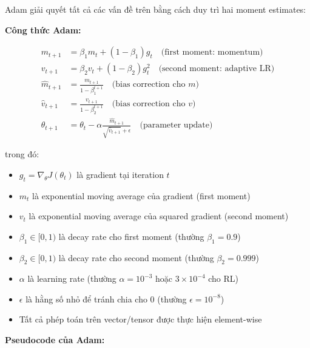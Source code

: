 Adam giải quyết tất cả các vấn đề trên bằng cách duy trì hai moment estimates:

\textbf{Công thức Adam:}

\begin{equation}
\begin{aligned}
m_{t+1} &= \beta_1 m_t + (1 - \beta_1) g_t \quad \text{(first moment: momentum)} \\
v_{t+1} &= \beta_2 v_t + (1 - \beta_2) g_t^2 \quad \text{(second moment: adaptive LR)} \\
\hat{m}_{t+1} &= \frac{m_{t+1}}{1 - \beta_1^{t+1}} \quad \text{(bias correction cho $m$)} \\
\hat{v}_{t+1} &= \frac{v_{t+1}}{1 - \beta_2^{t+1}} \quad \text{(bias correction cho $v$)} \\
\theta_{t+1} &= \theta_t - \alpha \frac{\hat{m}_{t+1}}{\sqrt{\hat{v}_{t+1}} + \epsilon} \quad \text{(parameter update)}
\end{aligned}
\end{equation}

trong đó:
\begin{itemize}[nosep]
\item $g_t = \nabla_\theta J(\theta_t)$ là gradient tại iteration $t$
\item $m_t$ là exponential moving average của gradient (first moment)
\item $v_t$ là exponential moving average của squared gradient (second moment)
\item $\beta_1 \in [0, 1)$ là decay rate cho first moment (thường $\beta_1 = 0.9$)
\item $\beta_2 \in [0, 1)$ là decay rate cho second moment (thường $\beta_2 = 0.999$)
\item $\alpha$ là learning rate (thường $\alpha = 10^{-3}$ hoặc $3 \times 10^{-4}$ cho RL)
\item $\epsilon$ là hằng số nhỏ để tránh chia cho 0 (thường $\epsilon = 10^{-8}$)
\item Tất cả phép toán trên vector/tensor được thực hiện element-wise
\end{itemize}

\textbf{Pseudocode của Adam:}

